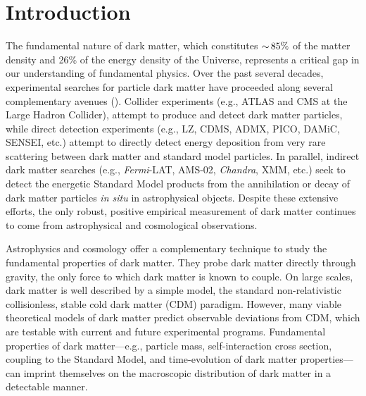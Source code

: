 \chapter{Introduction} 
\label{sec:intro}
\bigskip


The fundamental nature of dark matter, which constitutes $ {\sim}\, 85\%$ of the matter density and 26\% of the energy density of the Universe, represents a critical gap in our understanding of fundamental physics.
Over the past several decades, experimental searches for particle dark matter have proceeded along several complementary avenues ().
Collider experiments (e.g., ATLAS and CMS at the Large Hadron Collider), attempt to produce and detect dark matter particles, while  %
direct detection experiments (e.g., LZ, CDMS, ADMX, PICO, DAMiC, SENSEI, etc.) attempt to directly detect energy deposition from very rare scattering between dark matter and standard model particles.
In parallel, indirect dark matter searches (e.g., {\it Fermi}-LAT, AMS-02, {\it Chandra}, XMM, etc.) seek to detect the energetic Standard Model products from the annihilation or decay of dark matter particles {\it in situ} in astrophysical objects. %
Despite these extensive efforts, the only robust, positive empirical measurement of dark matter continues to come from astrophysical and cosmological observations. 




Astrophysics and cosmology offer a complementary technique to study the fundamental properties of dark matter. 
They probe dark matter directly through gravity, the only force to which dark matter is known to couple. On large scales, dark matter is well described by a simple model, the standard non-relativistic collisionless, stable cold dark matter (CDM) paradigm.
However, many viable theoretical models of dark matter predict observable deviations from CDM, which are testable with current and future experimental programs.
Fundamental properties of dark matter---e.g., particle mass, self-interaction cross section, coupling to the Standard Model, and time-evolution of dark matter properties---can imprint themselves on the macroscopic distribution of dark matter in a detectable manner.

